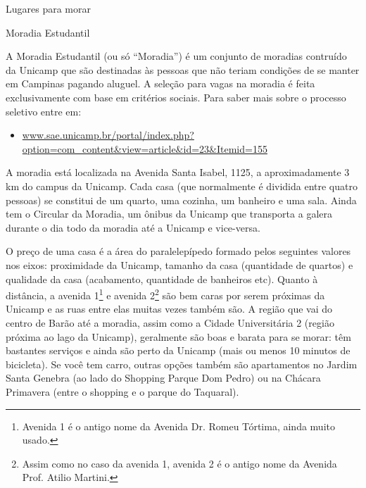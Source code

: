 
\begin{story}{Lugares para morar}

\begin{sidebar}{Moradia Estudantil} 


A Moradia Estudantil (ou só ``Moradia'') é um conjunto de moradias contruído da Unicamp que são destinadas às pessoas que não teriam condições de se manter em Campinas pagando aluguel. A seleção para vagas na moradia é feita exclusivamente com base em critérios sociais. Para saber mais sobre o processo seletivo entre em:

\begin{itemize}
\item \url{www.sae.unicamp.br/portal/index.php?option=com_content&view=article&id=23&Itemid=155}
\end{itemize}

A moradia está localizada na Avenida Santa Isabel, 1125, a aproximadamente 3 km do campus da Unicamp. Cada casa (que normalmente é dividida entre quatro pessoas) se constitui de um quarto, uma cozinha, um banheiro e uma sala. Ainda tem o Circular da Moradia, um ônibus da Unicamp que transporta a galera durante o dia todo da moradia até a Unicamp e vice-versa.

\end{sidebar}

O preço de uma casa é a área do paralelepípedo formado pelos seguintes valores nos eixos: proximidade da Unicamp, tamanho da casa (quantidade de quartos) e qualidade da casa (acabamento, quantidade de banheiros etc). Quanto à distância, a avenida 1\footnote{Avenida 1 é o antigo nome da Avenida Dr. Romeu Tórtima, ainda muito usado.} e avenida 2\footnote{Assim como no caso da avenida 1, avenida 2 é o antigo nome da Avenida Prof. Atilio Martini.} são bem caras por serem próximas da Unicamp e as ruas entre elas muitas vezes também são. A região que vai do centro de Barão até a moradia, assim como a Cidade Universitária 2 (região próxima ao lago da Unicamp), geralmente são boas e barata para se morar: têm bastantes serviços e ainda são perto da Unicamp (mais ou menos 10 minutos de bicicleta). Se você tem carro, outras opções também são apartamentos no Jardim Santa Genebra (ao lado do Shopping Parque Dom Pedro) ou na Chácara Primavera (entre o shopping e o parque do Taquaral).


\end{story}
